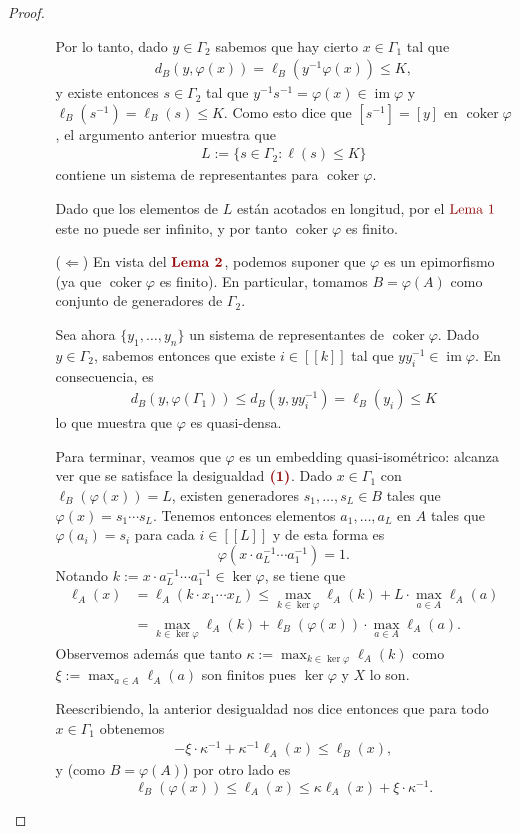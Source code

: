 \documentclass[11pt]{article}
\theoremstyle{colored}
\newcommand{\nat}[1]{[\![#1]\!]}
\newcommand{\im}{\operatorname{im}}
\newcommand{\coker}{\operatorname{coker}}
\newcommand{\paint}[1]{\color{color}{#1}}
\newcommand{\tpaint}[1]{\paint{\textbf{#1}}}
\begin{document}
\begin{proof}
\begin{itemize}[listparindent = \parindent]
\begin{itemize}[listparindent = \parindent]
Por lo tanto, dado $y \in \Gamma_2$ sabemos que hay cierto $x \in \Gamma_1$ tal que 
\begin{align*}
d_B(y, \varphi(x)) = \ell_B(y^{-1}\varphi(x)) \leq K,
\end{align*}
y existe entonces $s \in \Gamma_2$ tal que $y^{-1}s^{-1} = \varphi(x) \in \im \varphi$ y $\ell_B(s^{-1}) = \ell_B(s) \leq K$. Como esto dice que $[s^{-1}] = [y]$ en $\coker \varphi$, el argumento anterior muestra que
\begin{align*}
L := \{s \in \Gamma_2 : \ell(s) \leq K \}
\end{align*}
contiene un sistema de representantes para $\coker \varphi$. 

Dado que los elementos de $L$ están acotados en longitud, por el $\paint{\text{Lema $1$}}$ este no puede ser infinito, y por tanto $\coker \varphi$ es finito. 
\item[($\Leftarrow$)] En vista del $\tpaint{Lema 2}$, podemos suponer que $\varphi$ es un epimorfismo (ya que $\coker \varphi$ es finito). En particular, tomamos $B = \varphi(A)$ como conjunto de generadores de $\Gamma_2$. 

Sea ahora $\{y_1, \dots, y_n\}$ un sistema de representantes de $\coker \varphi$. Dado $y \in \Gamma_2$, sabemos entonces que existe $i \in \nat{k}$ tal que $yy_i^{-1} \in \im \varphi$. En consecuencia, es
\begin{align*}
d_B(y,\varphi(\Gamma_1)) \leq d_B(y,yy_i^{-1}) = \ell_B(y_i) \leq K
\end{align*}
lo que muestra que $\varphi$ es quasi-densa.

Para terminar, veamos que $\varphi$ es un embedding quasi-isométrico: alcanza ver que se satisface la desigualdad $\tpaint{(1)}$. Dado $x \in \Gamma_1$ con $\ell_B(\varphi(x)) = L$, existen generadores $s_1, \dots, s_L \in B$ tales que $\varphi(x) = s_1 \cdots s_L$. Tenemos entonces elementos $a_1, \dots, a_L$ en $A$ tales que $\varphi(a_i) = s_i$ para cada $i \in \nat{L}$ y de esta forma es
\[
\varphi(x \cdot a_L^{-1} \cdots a_1^{-1}) = 1.
\]
Notando $k := x \cdot a_L^{-1} \cdots a_1^{-1} \in \ker \varphi$, se tiene que
\begin{align*}
\ell_A(x) &= \ell_A(k \cdot x_1 \cdots x_L) \leq \max_{k \in \ker \varphi}\ell_A(k) + L \cdot \max_{a \in A}\ell_A(a)\\ &= \max_{k \in \ker \varphi}\ell_A(k) + \ell_B(\varphi(x)) \cdot \max_{a \in A}\ell_A(a). 
\end{align*}
Observemos  además que tanto $\kappa := \max_{k \in \ker \varphi}\ell_A(k)$ como $\xi := \max_{a \in A}\ell_A(a)$ son finitos pues $\ker \varphi$ y $X$ lo son. 

Reescribiendo, la anterior desigualdad nos dice entonces que para todo $x \in \Gamma_1$ obtenemos  
\begin{align*}
-\xi \cdot \kappa^{-1} + \kappa^{-1} \ell_A(x) \leq \ell_B(x),
\end{align*}
y (como $B = \varphi(A)$) por otro lado es
\[
\ell_B(\varphi(x)) \leq \ell_A(x) \leq \kappa\ell_A(x) + \xi \cdot \kappa^{-1}.
\]
\end{itemize}
\end{itemize}
\end{proof}
\end{document}
